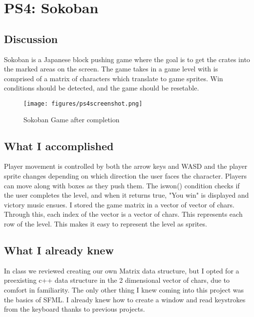 \section{PS4: Sokoban}\label{sec:ps4}

\subsection{Discussion}\label{sec:ps4:disc}

Sokoban is a Japanese block pushing game where the goal is to get the crates into the marked areas on the screen. The game takes in a game level with is comprised of a matrix of characters which translate to game sprites. Win conditions should be detected, and the game should be resetable. 

\begin{figure}[tbh]
	\centering
	\texttt{[image: figures/ps4screenshot.png]}
	\caption{Sokoban Game after completion}
	\label{fig:ps4ss}
\end{figure}


\subsection{What I accomplished}\label{sec:ps4:accomplish}

Player movement is controlled by both the arrow keys and WASD and the player sprite changes depending on which direction the user faces the character. Players can move along with boxes as they push them. The iswon() condition checks if the user completes the level, and when it returns true, "You win" is displayed and victory music ensues. I stored the game matrix in a vector of vector of chars. Through this, each index of the vector is a vector of chars. This represents each row of the level. This makes it easy to represent the level as sprites.

\subsection{What I already knew}\label{sec:ps4:knew}

In class we reviewed creating our own Matrix data structure, but I opted for a preexisting c++ data structure in the 2 dimensional vector of chars, due to comfort in familiarity. The only other thing I knew coming into this project was the basics of SFML. I already knew how to create a window and read keystrokes from the keyboard thanks to previous
projects.

